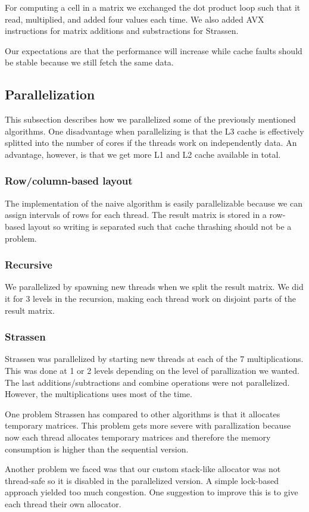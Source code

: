For computing a cell in a matrix we exchanged the dot product loop such that it read, multiplied, and added four values each time. We also added AVX instructions for matrix additions and substractions for Strassen.

Our expectations are that the performance will increase while cache faults should be stable because we still fetch the same data. 

\subsection{Parallelization}

This subsection describes how we parallelized some of the previously mentioned algorithms. One disadvantage when parallelizing is that the L3 cache is effectively splitted into the number of cores if the threads work on independently data. An advantage, however, is that we get more L1 and L2 cache available in total.

\subsubsection{Row/column-based layout}

The implementation of the naive algorithm is easily parallelizable because we can assign intervals of rows for each thread. The result matrix is stored in a row-based layout so writing is separated such that cache thrashing should not be a problem.

\subsubsection{Recursive}

We parallelized by spawning new threads when we split the result matrix. We did it for 3 levels in the recursion, making each thread work on disjoint parts of the result matrix.

\subsubsection{Strassen}

Strassen was parallelized by starting new threads at each of the 7 multiplications. This was done at 1 or 2 levels depending on the level of parallization we wanted. The last additions/subtractions and combine operations were not parallelized. However, the multiplications uses most of the time.

One problem Strassen has compared to other algorithms is that it allocates temporary matrices. This problem gets more severe with parallization because now each thread allocates temporary matrices and therefore the memory consumption is higher than the sequential version.

Another problem we faced was that our custom stack-like allocator was not thread-safe so it is disabled in the parallelized version. A simple lock-based approach yielded too much congestion. One suggestion to improve this is to give each thread their own allocator.
